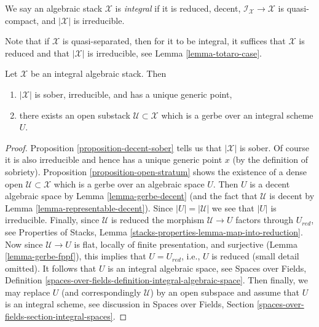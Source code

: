\begin{definition}
\label{definition-integral-algebraic-stack}
We say an algebraic stack $\mathcal{X}$ is
{\it integral} if it is reduced, decent,
$\mathcal{I}_\mathcal{X} \to \mathcal{X}$ is quasi-compact,
and $|\mathcal{X}|$ is irreducible.
\end{definition}

\noindent
Note that if $\mathcal{X}$ is quasi-separated, then
for it to be integral, it suffices that $\mathcal{X}$ is reduced
and that $|\mathcal{X}|$ is irreducible, see Lemma \ref{lemma-totaro-case}.

\begin{lemma}
\label{lemma-structure-integral-stack}
Let $\mathcal{X}$ be an integral algebraic stack. Then
\begin{enumerate}
\item $|\mathcal{X}|$ is sober, irreducible, and has a unique generic point,
\item there exists an open substack $\mathcal{U} \subset \mathcal{X}$ 
which is a gerbe over an integral scheme $U$.
\end{enumerate}
\end{lemma}

\begin{proof}
Proposition \ref{proposition-decent-sober} tells us that $|\mathcal{X}|$
is sober. Of course it is also irreducible and hence has a unique generic
point $x$ (by the definition of sobriety).
Proposition \ref{proposition-open-stratum} shows
the existence of a dense open $\mathcal{U} \subset \mathcal{X}$
which is a gerbe over an algebraic space $U$.
Then $U$ is a decent algebraic space by
Lemma \ref{lemma-gerbe-decent} (and the fact that $\mathcal{U}$
is decent by Lemma \ref{lemma-representable-decent}).
Since $|U| = |\mathcal{U}|$ we see that $|U|$ is irreducible.
Finally, since $\mathcal{U}$ is reduced the morphism
$\mathcal{U} \to U$ factors through $U_{red}$, see
Properties of Stacks, Lemma \ref{stacks-properties-lemma-map-into-reduction}.
Now since $\mathcal{U} \to U$ is flat, locally of finite presentation,
and surjective (Lemma \ref{lemma-gerbe-fppf}), this implies that
$U = U_{red}$, i.e., $U$ is reduced (small detail omitted).
It follows that $U$ is an integral algebraic space, see
Spaces over Fields, Definition
\ref{spaces-over-fields-definition-integral-algebraic-space}.
Then finally, we may replace $U$ (and correspondingly $\mathcal{U}$)
by an open subspace and assume that $U$ is an integral scheme, see
discussion in  Spaces over Fields, Section
\ref{spaces-over-fields-section-integral-spaces}.
\end{proof}

